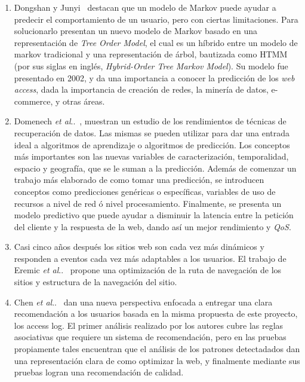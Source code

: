 \documentclass{udparticle}
\makeatletter
\DeclareRobustCommand\onedot{\futurelet\@let@token\@onedot}
\newcommand\@onedot{\ifx\@let@token.\else.\null\fi\xspace}
\newcommand\etal{\emph{et al}\onedot}
\makeatother
\begin{document}
\begin{enumerate}
  \item Dongshan y Junyi~\cite{tmmd} destacan que un modelo de Markov puede ayudar a predecir el comportamiento de un usuario, pero con ciertas limitaciones.
  Para solucionarlo presentan un nuevo modelo de Markov basado en una representación de \emph{Tree Order Model}, el cual es un híbrido entre un modelo de markov tradicional y una representación de árbol, bautizada como HTMM (por sus siglas en inglés, \emph{Hybrid-Order Tree Markov Model}).
  Su modelo fue presentado en 2002, y da una importancia a conocer la predicción de los \emph{web access}, dada la importancia de creación de redes, la minería de datos, e-commerce, y otras áreas.

  \item Domenech \etal~\cite{domenech}, muestran un estudio de los rendimientos de técnicas de recuperación de datos.
  Las mismas se pueden utilizar para dar una entrada ideal a algoritmos de aprendizaje o algoritmos de predicción. 
  Los conceptos más importantes son las nuevas variables de caracterización, temporalidad, espacio y geografía, que se le suman a la predicción. 
  Además de comenzar un trabajo más elaborado de como tomar una predicción, se introducen conceptos como predicciones genéricas o específicas, variables de uso de recursos a nivel de red ó nivel procesamiento.
  Finalmente, se presenta un modelo predictivo que puede ayudar a disminuir la latencia entre la petición del cliente y la respuesta de la web, dando así un mejor rendimiento y \emph{QoS}.

  \item Casi cinco años después los sitios web son cada vez más dinámicos y responden a eventos cada vez más adaptables a los usuarios. 
  El trabajo de Eremic \etal~\cite{Dragica2010} propone una optimización de la ruta de navegación de los sitios y estructura de la navegación del sitio. 

  \item Chen \etal~\cite{yuhua2011} dan una nueva perspectiva enfocada a entregar una clara recomendación a los usuarios basada en la misma propuesta de este proyecto, los access log.
  El primer análisis realizado por los autores cubre las reglas asociativas que requiere un sistema de recomendación, pero en las pruebas propiamente tales encuentran que el análisis de los patrones detectadados dan una representación clara de como optimizar la web, y finalmente mediante sus pruebas logran una recomendación de calidad.


\end{enumerate}
\end{document}
